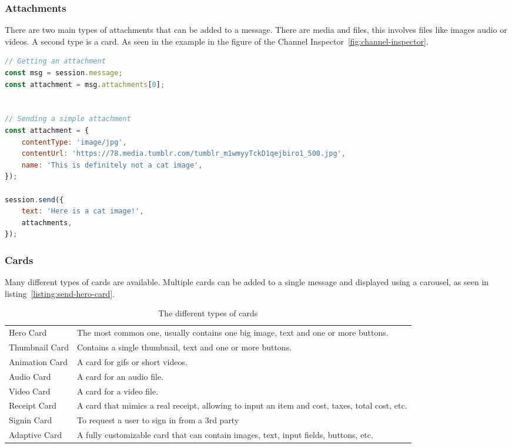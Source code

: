 \subsubsection{Attachments}

There are two main types of attachments that can be added to a message. There are media and files, this involves files like images audio or videos. A second type is a card. As seen in the example in the figure of the Channel Inspector~\ref{fig:channel-inspector}.

\begin{lstlisting}[language=JavaScript,caption=Receiving an attachment from the user and sending an image,label=listing:receive-attachment]
// Getting an attachment
const msg = session.message;
const attachment = msg.attachments[0];


// Sending a simple attachment
const attachment = {
	contentType: 'image/jpg',
	contentUrl: 'https://78.media.tumblr.com/tumblr_m1wmyyTckD1qejbiro1_500.jpg',
	name: 'This is definitely not a cat image',
});

session.send({
	text: 'Here is a cat image!',
	attachments,
});
\end{lstlisting}

\subsubsection{Cards}

Many different types of cards are available. Multiple cards can be added to a single message and displayed using a carousel, as seen in listing~\ref{listing:send-hero-card}.

\renewcommand{\arraystretch}{2}
\begin{table}[h]
	\centering
	\begin{tabular}{p{} |p{}}
		Hero Card      & The most common one, usually contains one big image, text and one or more buttons.             \\
		Thumbnail Card & Contains a single thumbnail, text and one or more buttons.                                     \\
		Animation Card & A card for gifs or short videos.                                                               \\
		Audio Card     & A card for an audio file.                                                                      \\
		Video Card     & A card for a video file.                                                                       \\
		Receipt Card   & A card that mimics a real receipt, allowing to input an item and cost, taxes, total cost, etc. \\
		Signin Card    & To request a user to sign in from a 3rd party                                                  \\
		Adaptive Card  & A fully customizable card that can contain images, text, input fields, buttons, etc.           \\
	\end{tabular}
	\caption{The different types of cards}
	\label{tab:card-types}
\end{table}

